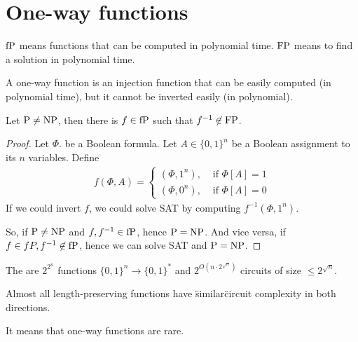 
\section{One-way functions}\label{sec:one_way_functions}


$\operatorname{fP}$ means functions that can be computed in polynomial time.
$\operatorname{FP}$ means to find a solution in polynomial time.

\begin{definition}
    A one-way function is an injection function that can be easily computed (in polynomial time), but it cannot be inverted easily (in polynomial).
\end{definition}

\begin{theorem}
    Let $\operatorname{P} \neq \operatorname{NP}$, then there is $f \in \operatorname{fP}$ such that $f^{-1} \not \in \operatorname{FP}$.
\end{theorem}
\begin{proof}
    Let $\Phi$. be a Boolean formula.
    Let $A \in \{0, 1\}^n$ be a Boolean assignment to its $n$ variables.
    Define
    \begin{align*}
        f(\Phi, A) = \begin{cases}
        (\Phi, 1^n), &\text{ if } \Phi[A]=1 \\
        (\Phi, 0^n), &\text{ if } \Phi[A]=0
        \end{cases}
    \end{align*}
    If we could invert $f$, we could solve SAT by computing $f^{-1}(\Phi, 1^n)$.

    So, if $\operatorname{P} \neq \operatorname{NP}$ and $f, f^{-1} \in \operatorname{fP}$, hence $\operatorname{P} = \operatorname{NP}$.
    And vice versa, if $f \in fP, f^{-1} \not\in \operatorname{fP}$, hence we can solve SAT and $\operatorname{P} = \operatorname{NP}$.
\end{proof}

\begin{statement}
    The are $2^{2^n}$ functions $\{0, 1\}^n \to \{0, 1\}^*$ and $2^{O(n \cdot 2^{\sqrt n})}$ circuits of size $\leq 2^{\sqrt n}$.
\end{statement}

\begin{exercise}
    Almost all length-preserving functions have \"similar\" circuit complexity in both directions.
\end{exercise}

It means that one-way functions are rare.

